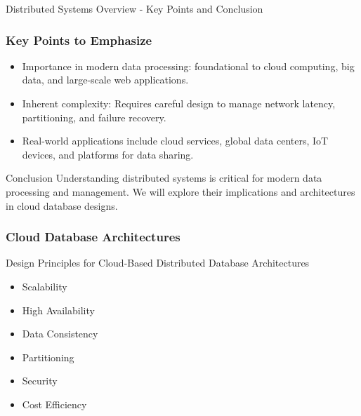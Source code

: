 \documentclass[aspectratio=169]{beamer}
\begin{document}
\begin{frame}[fragile]{Distributed Systems Overview - Key Points and Conclusion}
    \frametitle{Key Points to Emphasize}
    \begin{itemize}
        \item Importance in modern data processing: foundational to cloud computing, big data, and large-scale web applications.
        \item Inherent complexity: Requires careful design to manage network latency, partitioning, and failure recovery.
        \item Real-world applications include cloud services, global data centers, IoT devices, and platforms for data sharing.
    \end{itemize}

    \begin{block}{Conclusion}
        Understanding distributed systems is critical for modern data processing and management. We will explore their implications and architectures in cloud database designs.
    \end{block}
\end{frame}

\begin{frame}[fragile]
    \frametitle{Cloud Database Architectures}
    \begin{block}{Design Principles for Cloud-Based Distributed Database Architectures}
        \begin{itemize}
            \item Scalability
            \item High Availability
            \item Data Consistency
            \item Partitioning
            \item Security
            \item Cost Efficiency
        \end{itemize}
    \end{block}
\end{frame}
\end{document}
